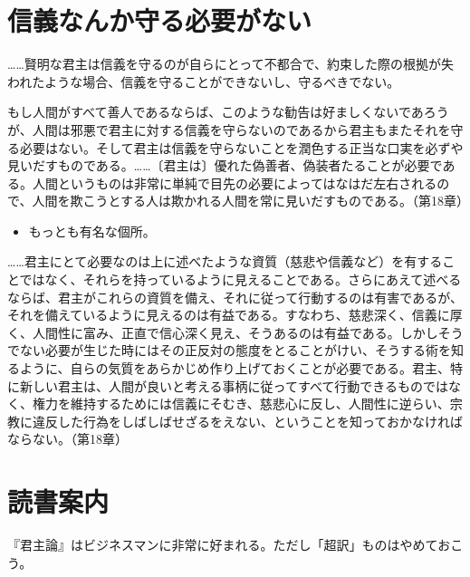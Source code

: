 \documentclass[autodetect-engine,dvipdfmx-if-dvi,ja=standard]{bxjsarticle} \usepackage{mystyle}
\begin{document}
\section{信義なんか守る必要がない}



\begin{oframed}
  ……賢明な君主は信義を守るのが自らにとって不都合で、約束した際の根拠が失われたような場合、信義を守ることができないし、守るべきでない。

  もし人間がすべて善人であるならば、このような勧告は好ましくないであろうが、人間は邪悪で君主に対する信義を守らないのであるから君主もまたそれを守る必要はない。そして君主は信義を守らないことを潤色する正当な口実を必ずや見いだすものである。……〔君主は〕優れた偽善者、偽装者たることが必要である。人間というものは非常に単純で目先の必要によってはなはだ左右されるので、人間を欺こうとする人は欺かれる人間を常に見いだすものである。（第18章）

\end{oframed}



\begin{itemize}
\item もっとも有名な個所。
\end{itemize}

\begin{oframed}

……君主にとて必要なのは上に述べたような資質（慈悲や信義など）を有することではなく、それらを持っているように見えることである。さらにあえて述べるならば、君主がこれらの資質を備え、それに従って行動するのは有害であるが、それを備えているように見えるのは有益である。すなわち、慈悲深く、信義に厚く、人間性に富み、正直で信心深く見え、そうあるのは有益である。しかしそうでない必要が生じた時にはその正反対の態度をとることがけい、そうする術を知るように、自らの気質をあらかじめ作り上げておくことが必要である。君主、特に新しい君主は、人間が良いと考える事柄に従ってすべて行動できるものではなく、権力を維持するためには信義にそむき、慈悲心に反し、人間性に逆らい、宗教に違反した行為をしばしばせざるをえない、ということを知っておかなければならない。（第18章）
  
\end{oframed}



\section{読書案内}

『君主論』はビジネスマンに非常に好まれる。ただし「超訳」ものはやめておこう。
\end{document}

